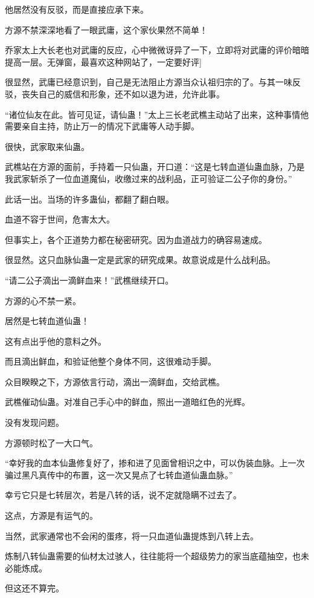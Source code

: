 \begin{this_body}
他居然没有反驳，而是直接应承下来。

方源不禁深深地看了一眼武庸，这个家伙果然不简单！

乔家太上大长老也对武庸的反应，心中微微讶异了一下，立即将对武庸的评价暗暗提高一层。无弹窗，最喜欢这种网站了，一定要好评]

很显然，武庸已经意识到，自己是无法阻止方源当众认祖归宗的了。与其一味反驳，丧失自己的威信和形象，还不如以退为进，允许此事。

“诸位仙友在此。皆可见证，请仙蛊！”太上三长老武樵主动站了出来，这种事情他需要亲自主持，防止万一的情况下武庸等人动手脚。

很快，武家取来仙蛊。

武樵站在方源的面前，手持着一只仙蛊，开口道：“这是七转血道仙蛊血脉，乃是我武家斩杀了一位血道魔仙，收缴过来的战利品，正可验证二公子你的身份。”

此话一出。当场的许多蛊仙，都翻了翻白眼。

血道不容于世间，危害太大。

但事实上，各个正道势力都在秘密研究。因为血道战力的确容易速成。

很显然。这只血脉仙蛊一定是武家的研究成果。故意说成是什么战利品。

“请二公子滴出一滴鲜血来！”武樵继续开口。

方源的心不禁一紧。

居然是七转血道仙蛊！

这有点出乎他的意料之外。

而且滴出鲜血，和验证他整个身体不同，这很难动手脚。

众目睽睽之下，方源依言行动，滴出一滴鲜血，交给武樵。

武樵催动仙蛊。对准自己手心中的鲜血，照出一道暗红色的光辉。

没有发现问题。

方源顿时松了一大口气。

“幸好我的血本仙蛊修复好了，掺和进了见面曾相识之中，可以伪装血脉。上一次骗过黑凡真传中的布置，这一次又晃点了七转血道仙蛊血脉。”

幸亏它只是七转层次，若是八转的话，说不定就隐瞒不过去了。

这点，方源是有运气的。

当然，武家通常也不会闲的蛋疼，将一只血道仙蛊提炼到八转上去。

炼制八转仙蛊需要的仙材太过骇人，往往能将一个超级势力的家当底蕴抽空，也未必能炼成。

但这还不算完。


\end{this_body}
